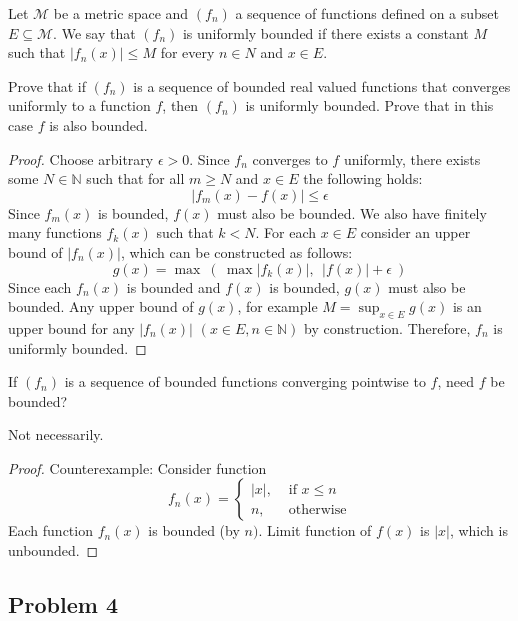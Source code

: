 \documentclass{article}
\begin{document}
\begin{tcolorbox}
Let $\mathcal{M}$ be a metric space and $(f_n)$ a sequence of functions defined on a subset $E \subseteq \mathcal{M}$. We say that $(f_n)$ is uniformly bounded if there exists a constant $M$ such that $|f_n (x)| \leq M$ for every $n \in N$ and $x \in E$.

Prove that if $(f_n)$ is a sequence of bounded real valued functions that converges uniformly to a function $f$, then $(f_n)$ is uniformly bounded. Prove that in this case $f$ is also bounded.
\end{tcolorbox}
\begin{proof}
Choose arbitrary $\epsilon>0$. Since $f_n$ converges to $f$  uniformly, there exists some $N \in \mathbb{N}$ such that for all $m \geq N$ and $x \in E$ the following holds:
$$ |f_m(x)-f(x)| \leq \epsilon $$
Since $f_m(x)$ is bounded, $f(x)$ must also be bounded. We also have finitely many functions $f_k(x)$ such that $k<N$. For each $x \in E$ consider an upper bound of $|f_n(x)|$, which can be constructed as follows:
$$ g(x) = \max \> ( \> \max |f_k(x)|, \>\> |f(x)| + \epsilon \> ) $$
Since each $f_n(x)$ is bounded and $f(x)$ is bounded, $g(x)$ must also be bounded. Any upper bound of $g(x)$, for example $M = \sup_{x\in E} g(x)$ is an upper bound for any $|f_n(x)|$ $(x \in E, n \in \mathbb{N})$ by construction. Therefore, $f_n$ is uniformly bounded.
\end{proof}

\begin{tcolorbox}
If $(f_n)$ is a sequence of bounded functions converging pointwise to $f$, need $f$ be bounded?
\end{tcolorbox}
Not necessarily.
\begin{proof}
Counterexample: Consider function
$$ f_n(x) =
\begin{cases}
    |x|, & \text{ if $x \leq n$} \\
    n, & \text{ otherwise}
\end{cases}
$$
Each function $f_n(x)$ is bounded (by $n)$. Limit function of $f(x)$ is $|x|$, which is unbounded.
\end{proof}


\subsection*{Problem 4}
\end{document}

